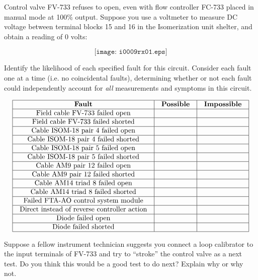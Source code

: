 

Control valve FV-733 refuses to open, even with flow controller FC-733 placed in manual mode at 100\% output.  Suppose you use a voltmeter to measure DC voltage between terminal blocks 15 and 16 in the Isomerization unit shelter, and obtain a reading of 0 volts:

$$\texttt{[image: i0009rx01.eps]}$$

Identify the likelihood of each specified fault for this circuit.  Consider each fault one at a time (i.e. no coincidental faults), determining whether or not each fault could independently account for {\it all} measurements and symptoms in this circuit.


$$\vbox{\offinterlineskip
\halign{\strut
\vrule \quad\hfil # \ \hfil & 
\vrule \quad\hfil # \ \hfil & 
\vrule \quad\hfil # \ \hfil \vrule \cr
\noalign{\hrule}
%
{\bf Fault} & {\bf Possible} & {\bf Impossible} \cr
%
\noalign{\hrule}
%
Field cable FV-733 failed open &  &  \cr
%
\noalign{\hrule}
%
Field cable FV-733 failed shorted &  &  \cr
%
\noalign{\hrule}
%
Cable ISOM-18 pair 4 failed open &  &  \cr
%
\noalign{\hrule}
%
Cable ISOM-18 pair 4 failed shorted &  &  \cr
%
\noalign{\hrule}
%
Cable ISOM-18 pair 5 failed open &  &  \cr
%
\noalign{\hrule}
%
Cable ISOM-18 pair 5 failed shorted &  &  \cr
%
\noalign{\hrule}
%
Cable AM9 pair 12 failed open &  &  \cr
%
\noalign{\hrule}
%
Cable AM9 pair 12 failed shorted &  &  \cr
%
\noalign{\hrule}
%
Cable AM14 triad 8 failed open &  &  \cr
%
\noalign{\hrule}
%
Cable AM14 triad 8 failed shorted &  &  \cr
%
\noalign{\hrule}
%
Failed FTA-AO control system module &  &  \cr
%
\noalign{\hrule}
%
Direct instead of reverse controller action &  &  \cr
%
\noalign{\hrule}
%
Diode failed open &  &  \cr
%
\noalign{\hrule}
%
Diode failed shorted &  &  \cr
%
\noalign{\hrule}
} %
}$$ %

Suppose a fellow instrument technician suggests you connect a loop calibrator to the input terminals of FV-733 and try to ``stroke'' the control valve as a next test.  Do you think this would be a good test to do next?  Explain why or why not.

